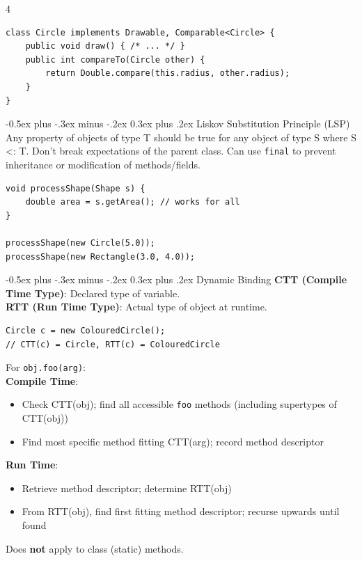 \documentclass[10pt]{article}
\makeatletter
\renewcommand{\section}{\@startsection{section}{1}{0mm}%
                                {-0.5ex plus -.3ex minus -.2ex}%
                                {0.3ex plus .2ex}%
                                {\normalfont\large\bfseries}}
\renewcommand{\subsection}{\@startsection{subsection}{2}{0mm}%
                                {-0.5ex plus -.3ex minus -.2ex}%
                                {0.3ex plus .2ex}%
                                {\normalfont\normalsize\bfseries}}
\makeatother
\begin{document}
\begin{multicols}{4}
\begin{verbatim}
class Circle implements Drawable, Comparable<Circle> {
    public void draw() { /* ... */ }
    public int compareTo(Circle other) {
        return Double.compare(this.radius, other.radius);
    }
}
\end{verbatim}

\subsection{Liskov Substitution Principle (LSP)}
Any property of objects of type T should be true for any object of type S where S <: T. Don't break expectations of the parent class. Can use \texttt{final} to prevent inheritance or modification of methods/fields.
\begin{verbatim}
void processShape(Shape s) {
    double area = s.getArea(); // works for all
}

processShape(new Circle(5.0));
processShape(new Rectangle(3.0, 4.0));
\end{verbatim}

\section{Dynamic Binding}
\textbf{CTT (Compile Time Type)}: Declared type of variable.\\
\textbf{RTT (Run Time Type)}: Actual type of object at runtime.
\begin{verbatim}
Circle c = new ColouredCircle();
// CTT(c) = Circle, RTT(c) = ColouredCircle
\end{verbatim}
For \texttt{obj.foo(arg)}:\\
\textbf{Compile Time}:
\begin{itemize}
  \item Check CTT(obj); find all accessible \texttt{foo} methods (including supertypes of CTT(obj))
  \item Find most specific method fitting CTT(arg); record method descriptor
\end{itemize}
\textbf{Run Time}:
\begin{itemize}
  \item Retrieve method descriptor; determine RTT(obj)
  \item From RTT(obj), find first fitting method descriptor; recurse upwards until found
\end{itemize}
Does \textbf{not} apply to class (static) methods.


\end{multicols}
\end{document}
